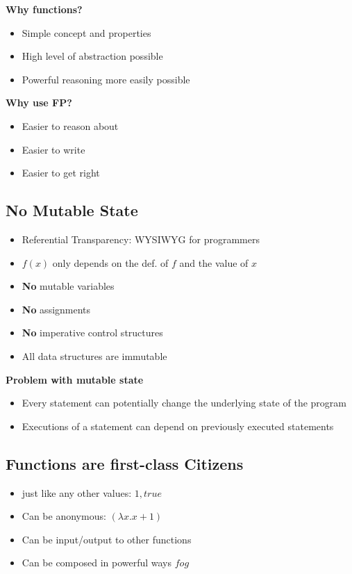 \textbf{Why functions?}
\begin{itemize}
    \item Simple concept and properties
    \item High level of abstraction possible
    \item Powerful reasoning more easily possible
\end{itemize}

\textbf{Why use FP?}
\begin{itemize}
    \item Easier to reason about
    \item Easier to write
    \item Easier to get right
\end{itemize}

\subsection{No Mutable State}
\begin{itemize}
    \item Referential Transparency: WYSIWYG for programmers
    \item $f(x)$ only depends on the def. of $f$ and the value of $x$
    \item \textbf{No} mutable variables
    \item \textbf{No} assignments
    \item \textbf{No} imperative control structures
    \item All data structures are immutable
\end{itemize}
\textbf{Problem with mutable state}
\begin{itemize}
    \item Every statement can potentially change the underlying state of the program
    \item Executions of a statement can depend on previously executed statements
\end{itemize}

\subsection{Functions are first-class Citizens}
\begin{itemize}
    \item just like any other values: $1, true$
    \item Can be anonymous: $(\lambda x . x + 1)$
    \item Can be input/output to other functions
    \item Can be composed in powerful ways $f o g$
\end{itemize}


